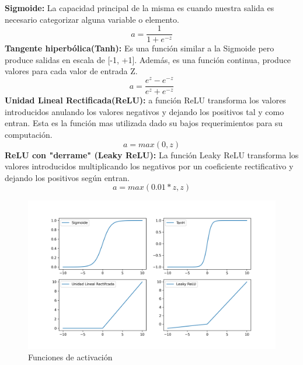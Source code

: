 \begin{itemize}
        \textbf{Sigmoide:} La capacidad principal de la misma es cuando nuestra
        salida es necesario categorizar alguna variable o elemento.
        \begin{equation*}
            a = \frac{1}{1 + e^{-z}} 
        \end{equation*}
        \textbf{Tangente hiperbólica(Tanh):} Es una función similar a la Sigmoide
        pero produce salidas en escala de [-1, +1]. Además, es una función
        continua, produce valores para cada valor de entrada Z.
        \begin{equation*}
            a = \frac{e^{z} - e^{-z}}{e^{z} + e^{-z}}
        \end{equation*}
        \textbf{Unidad Lineal Rectificada(ReLU):} a función ReLU transforma los
        valores introducidos anulando los valores negativos y dejando los positivos
        tal y como entran. Esta es la función mas utilizada dado su bajos
        requerimientos para su computación. 
        \begin{equation*}
            a = max(0,z)
        \end{equation*}
        \textbf{ReLU con "derrame" (Leaky ReLU):} La función Leaky ReLU transforma
        los valores introducidos multiplicando los negativos por un coeficiente
        rectificativo y dejando los positivos según entran.
        \begin{equation*}
            a = max(0.01*z, z)
        \end{equation*}
        \begin{figure}[H]
            \centering
            \includegraphics[width=\textwidth, keepaspectratio, height=7 cm]{images/funcionesdeactivacione.png}
            \caption{Funciones de activación}
            \label{fig:funciones de activacion}
        \end{figure}
\end{itemize}


